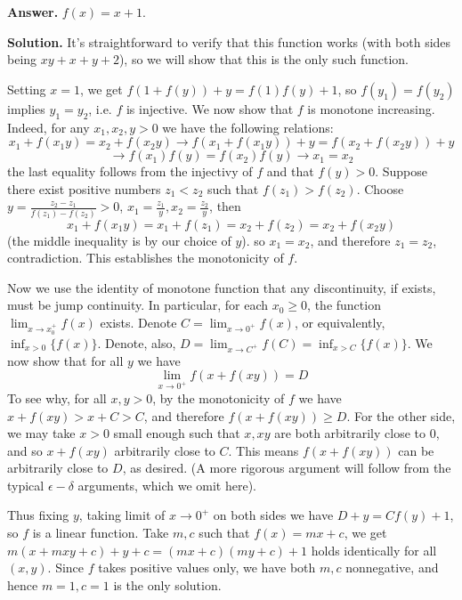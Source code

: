 \documentclass[11pt,a4paper]{article}
\begin{document}
\begin{enumerate}
	\textbf{Answer.} $f(x) = x + 1$. 
	
	\textbf{Solution.} It's straightforward to verify that this function works (with both sides being $xy + x + y + 2$), 
	so we will show that this is the only such function. 
	
	Setting $x=1$, we get $f(1 + f(y)) + y = f(1)f(y) + 1$, so $f(y_1)=f(y_2)$ implies $y_1=y_2$, i.e. $f$ is injective. 
	We now show that $f$ is monotone increasing. 
	Indeed, for any $x_1, x_2, y  > 0$ we have the following relations: 
	\[
	x_1 + f(x_1y) = x_2 + f(x_2y)
	\to f(x_1 + f(x_1y)) + y = f(x_2 + f(x_2y)) + y
	\]\[
	\to f(x_1)f(y)=f(x_2)f(y)
	\to x_1=x_2
	\]
	the last equality follows from the injectivy of $f$ and that $f(y) > 0$. 
	Suppose there exist positive numbers $z_1 < z_2$ such that $f(z_1) > f(z_2)$. 
	Choose $y = \frac{z_2-z_1}{f(z_1)-f(z_2)}> 0$, 
	$x_1 = \frac{z_1}{y}, x_2 = \frac{z_2}{y}$, 
	then 
	\[
	x_1 + f(x_1y)
	=x_1 + f(z_1)
	=x_2 + f(z_2)
	=x_2 + f(x_2y)
	\]
	(the middle inequality is by our choice of $y$). 
	so $x_1=x_2$, and therefore $z_1=z_2$, contradiction. 
	This establishes the monotonicity of $f$. 
	
	Now we use the identity of monotone function that any discontinuity, if exists, must be jump continuity. 
	In particular, for each $x_0\ge 0$, the function $\lim_{x\to x_0^+}f(x)$ exists. 
	Denote $C = \lim_{x\to 0^+} f(x)$, 
	or equivalently, $\inf_{x > 0} \{f(x)\}$. 
	Denote, also, $D = \lim_{x\to C^+} f(C) =  \inf_{x > C} \{f(x)\}$. 
	We now show that for all $y$ we have 
	\[
	\lim_{x\to 0^+} f(x + f(xy)) = D
	\]
	To see why, for all $x, y > 0$, by the monotonicity of $f$ we have $x + f(xy) > x + C > C$, 
	and therefore $f(x + f(xy)) \ge D$. 
	For the other side, we may take $x > 0$ small enough such that $x, xy$ are both arbitrarily close to 0, 
	and so $x + f(xy)$ arbitrarily close to $C$. 
	This means $f(x + f(xy))$ can be arbitrarily close to $D$, as desired. 
	(A more rigorous argument will follow from the typical $\epsilon-\delta$ arguments, which we omit here). 
	
	Thus fixing $y$, taking limit of $x\to 0^+$ on both sides we have $D + y = Cf(y) + 1$, 
	so $f$ is a linear function. 
	Take $m, c$ such that $f(x) = mx + c$, 
	we get $m(x + mxy + c) + y + c = (mx+c)(my+c)+1$ holds identically for all $(x, y)$. 
	Since $f$ takes positive values only, we have both $m, c$ nonnegative, 
	and hence $m=1, c=1$ is the only solution. 
\end{enumerate}
\end{document}
